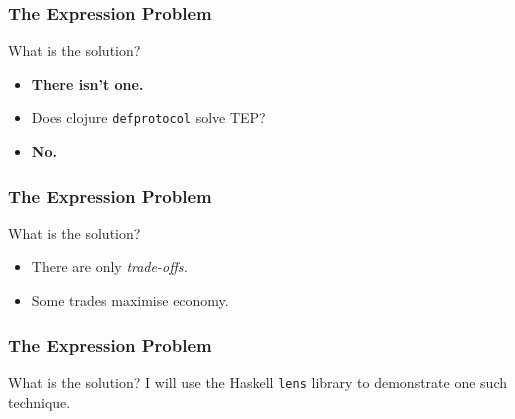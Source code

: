 \begin{frame}[fragile]
\frametitle{The Expression Problem}
\begin{block}{What is the solution?}
\begin{itemize}
\item<1-> \textbf{There isn't one.}
\item<2-> Does clojure \lstinline{defprotocol} solve TEP?
\item<3-> \textbf{No.} 
\end{itemize}
\end{block}
\end{frame}

\begin{frame}[fragile]
\frametitle{The Expression Problem}
\begin{block}{What is the solution?}
\begin{itemize}
\item<1-> There are only \emph{trade-offs.}
\item<2-> Some trades maximise economy. 
\end{itemize}
\end{block}
\end{frame}

\begin{frame}[fragile]
\frametitle{The Expression Problem}
\begin{block}{What is the solution?}
I will use the Haskell \lstinline{lens} library to demonstrate one such technique. 
\end{block}
\end{frame}
